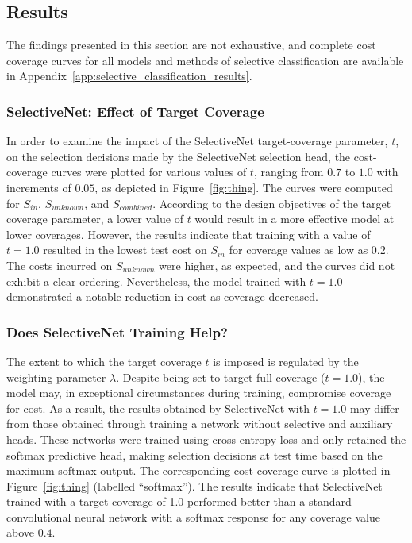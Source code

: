 \subsection{Results}
The findings presented in this section are not exhaustive, and complete cost coverage curves for all models and methods of selective classification are available in Appendix~\ref{app:selective_classification_results}.

\subsubsection{SelectiveNet: Effect of Target Coverage}
In order to examine the impact of the SelectiveNet target-coverage parameter, $t$, on the selection decisions made by the SelectiveNet selection head, the cost-coverage curves were plotted for various values of $t$, ranging from $0.7$ to $1.0$ with increments of $0.05$, as depicted in Figure~\ref{fig:thing}. The curves were computed for $S_{in}$, $S_{unknown}$, and $S_{combined}$. According to the design objectives of the target coverage parameter, a lower value of $t$ would result in a more effective model at lower coverages. However, the results indicate that training with a value of $t=1.0$ resulted in the lowest test cost on $S_{in}$ for coverage values as low as $0.2$. The costs incurred on $S_{unknown}$ were higher, as expected, and the curves did not exhibit a clear ordering. Nevertheless, the model trained with $t=1.0$ demonstrated a notable reduction in cost as coverage decreased.

\subsubsection{Does SelectiveNet Training Help?}
The extent to which the target coverage $t$ is imposed is regulated by the weighting parameter $\lambda$. Despite being set to target full coverage ($t=1.0$), the model may, in exceptional circumstances during training, compromise coverage for cost. As a result, the results obtained by SelectiveNet with $t=1.0$ may differ from those obtained through training a network without selective and auxiliary heads. These networks were trained using cross-entropy loss and only retained the softmax predictive head, making selection decisions at test time based on the maximum softmax output. The corresponding cost-coverage curve is plotted in Figure~\ref{fig:thing} (labelled “softmax”). The results indicate that SelectiveNet trained with a target coverage of 1.0 performed better than a standard convolutional neural network with a softmax response for any coverage value above $0.4$.

